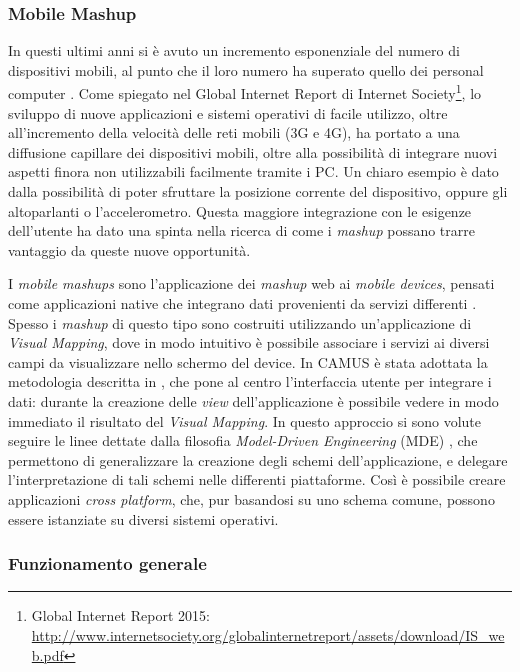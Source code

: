 \subsubsection{Mobile Mashup\label{sec:mobile-mashup}}

In questi ultimi anni si è avuto un incremento esponenziale del numero di dispositivi mobili, al punto che il loro numero ha superato quello dei personal computer \cite{10.1109/ICSC.2008.100}. Come spiegato nel Global Internet Report di Internet Society\footnote{Global Internet Report 2015: \url{http://www.internetsociety.org/globalinternetreport/assets/download/IS_web.pdf}}, lo sviluppo di nuove applicazioni e sistemi operativi di facile utilizzo, oltre all'incremento della velocità delle reti mobili (3G e 4G), ha portato a una diffusione capillare dei dispositivi mobili, oltre alla possibilità di integrare nuovi aspetti finora non utilizzabili facilmente tramite i PC. Un chiaro esempio è dato dalla possibilità di poter sfruttare la posizione corrente del dispositivo, oppure gli altoparlanti o l'accelerometro.
Questa maggiore integrazione con le esigenze dell'utente ha dato una spinta nella ricerca di come i \emph{mashup} possano trarre vantaggio da queste nuove opportunità.

I \emph{mobile mashups} sono l'applicazione dei \emph{mashup} web ai \emph{mobile devices}, pensati come applicazioni native che integrano dati provenienti da servizi differenti \cite{Cappiello2013}. 
Spesso i \emph{mashup} di questo tipo sono costruiti utilizzando un'applicazione di \emph{Visual Mapping}, dove in modo intuitivo è possibile associare i servizi ai diversi campi da visualizzare nello schermo del device.
In CAMUS è stata adottata la metodologia descritta in \cite{Cappiello:2015:UAE:2788341.2735632}, che pone al centro l'interfaccia utente per integrare i dati: durante la creazione delle \emph{view} dell'applicazione è possibile vedere in modo immediato il risultato del \emph{Visual Mapping}. In questo approccio si sono volute seguire le linee dettate dalla filosofia \emph{Model-Driven Engineering} (MDE) \cite{schmidt2006model}, che permettono di generalizzare la creazione degli schemi dell'applicazione, e delegare l'interpretazione di tali schemi nelle differenti piattaforme. Così è possibile creare applicazioni \emph{cross platform}, che, pur basandosi su uno schema comune, possono essere istanziate su diversi sistemi operativi. 

\subsubsection{Funzionamento generale\label{sec:mashup-operations}}

